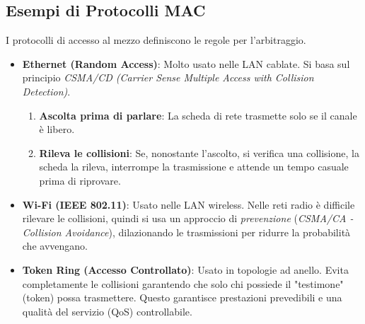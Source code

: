 \subsection{Esempi di Protocolli MAC}
I protocolli di accesso al mezzo definiscono le regole per l'arbitraggio.
\begin{itemize}
    \item \textbf{Ethernet (Random Access)}: Molto usato nelle LAN cablate. Si basa sul principio \textit{CSMA/CD (Carrier Sense Multiple Access with Collision Detection)}.
    \begin{enumerate}
        \item \textbf{Ascolta prima di parlare}: La scheda di rete trasmette solo se il canale è libero.
        \item \textbf{Rileva le collisioni}: Se, nonostante l'ascolto, si verifica una collisione, la scheda la rileva, interrompe la trasmissione e attende un tempo casuale prima di riprovare.
    \end{enumerate}
    \item \textbf{Wi-Fi (IEEE 802.11)}: Usato nelle LAN wireless. Nelle reti radio è difficile rilevare le collisioni, quindi si usa un approccio di \textit{prevenzione} (\textit{CSMA/CA - Collision Avoidance}), dilazionando le trasmissioni per ridurre la probabilità che avvengano.
    \item \textbf{Token Ring (Accesso Controllato)}: Usato in topologie ad anello. Evita completamente le collisioni garantendo che solo chi possiede il "testimone" (token) possa trasmettere. Questo garantisce prestazioni prevedibili e una qualità del servizio (QoS) controllabile.
\end{itemize}
